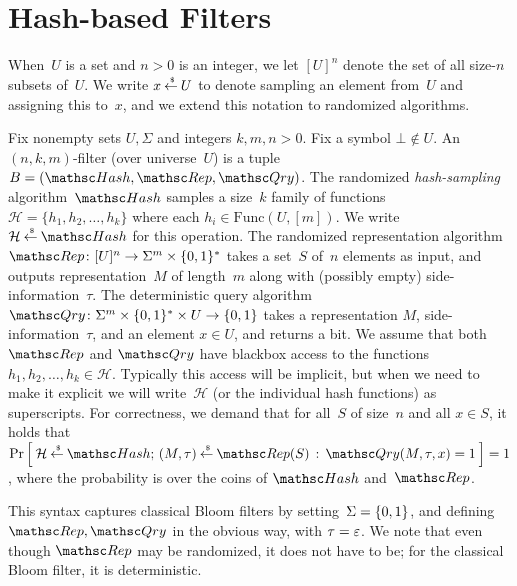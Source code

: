\section{Hash-based Filters}
When~$U$ is a set and $n>0$ is an integer, we let $[U]^n$ denote the set of all size-$n$ subsets of~$U$. We write $x {\:\stackrel{{\scriptscriptstyle \hspace{0.2em}\$}} {\leftarrow}\:} U$ to denote sampling an element from~$U$ and assigning this to~$x$, and we extend this notation to randomized algorithms.

Fix nonempty sets $U,\Sigma$ and integers $k,m,n>0$.  Fix a symbol $\bot \not\in U$. An $(n,k,m)$-filter (over universe~$U$) is a tuple $B=(\Hash,\Rep,\Qry)$.
%
The randomized \emph{hash-sampling} algorithm~$\Hash$ samples a size~$k$ family of functions~$\mathcal{H}=\{h_1,h_2,\ldots,h_k\}$ where each $h_i \in \mathrm{Func}(U,[m])$.  
We write $\mathcal{H} \getsr \Hash$ for this operation.
%
The randomized representation algorithm $\Rep\colon [U]^n \rightarrow \Sigma^m \times \bits^*$ takes a set~$S$ of~$n$ elements as input, and outputs representation~$M$ of length~$m$ along with (possibly empty) side-information~$\tau$.
%
The deterministic query algorithm $\Qry\colon \Sigma^m \times \bits^* \times U \rightarrow \bits$ takes a representation $M$, side-information~$\tau$, and an element $x \in U$, and returns a bit.
%
We assume that both $\Rep$ and $\Qry$ have blackbox access to the functions $h_1,h_2,\ldots,h_k \in \mathcal{H}$.  Typically this access will be implicit, but when we need to make it explicit we will write~$\mathcal{H}$ (or the individual hash functions) as superscripts.
%
For correctness, we demand that for all~$S$ of size~$n$ and all $x \in S$, it holds that $\Prob{\mathcal{H}\getsr\Hash;\,(M,\tau)\getsr\Rep(S)\,:\,\Qry(M,\tau,x)=1}=1$, where the probability is over the coins of $\Hash$ and~$\Rep$.


This syntax captures classical Bloom filters by setting~$\Sigma=\{0,1\}$, and defining $\Rep,\Qry$ in the obvious way, with $\tau=\varepsilon$. We note that even though $\Rep$ may be randomized, it does not have to be; for the classical Bloom filter, it is deterministic.

